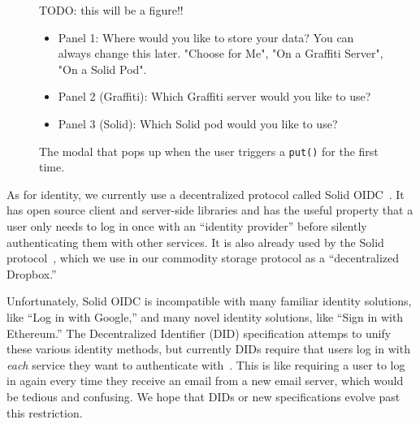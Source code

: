 
\begin{figure}
    \label{above-and-below:choose-protocol}
    TODO: this will be a figure!!
    \begin{itemize}
    \item
    Panel 1: Where would you like to store your data? You can always change this later.
    "Choose for Me", "On a Graffiti Server", "On a Solid Pod".
    \item
    Panel 2 (Graffiti): Which Graffiti server would you like to use?
    \item
    Panel 3 (Solid): Which Solid pod would you like to use?
    \end{itemize}
    \caption{The modal that pops up when the user triggers a \texttt{put()} for the first time.}
\end{figure}

As for identity, we currently use a decentralized protocol called Solid OIDC~\cite{solidoidc}.
It has open source client and server-side libraries and has
the useful property that a user only needs to log in once
with an ``identity provider'' before silently authenticating
them with other services.
It is also already used by the Solid protocol~\cite{solid},
which we use in our commodity storage protocol as a ``decentralized Dropbox.''

Unfortunately, Solid OIDC is incompatible with many familiar
identity solutions, like ``Log in with Google,''
and many novel identity solutions, like ``Sign in with Ethereum.''
The Decentralized Identifier (DID) specification attemps to unify
these various identity methods, but currently DIDs require that
users log in with \emph{each} service they want to authenticate with~\cite{dids}.
This is like requiring a user to log in again every time
they receive an email from a new email server, which would
be tedious and confusing.
We hope that DIDs or new specifications evolve past this restriction.







